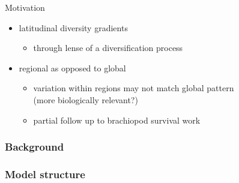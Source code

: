 \documentclass{beamer}
\begin{document}
\begin{frame}
  \begin{block}{Motivation}
    \begin{itemize}
      \item latitudinal diversity gradients
        \begin{itemize}
          \item through lense of a diversification process
        \end{itemize}
      \item regional as opposed to global
        \begin{itemize}
          \item variation within regions may not match global pattern \\(more biologically relevant?)
          \item partial follow up to brachiopod survival work
        \end{itemize}
    \end{itemize}
  \end{block}
\end{frame}

\begin{frame}
  \frametitle{Background}
\end{frame}

\begin{frame}
  \frametitle{Model structure}
\end{frame}
\end{document}
